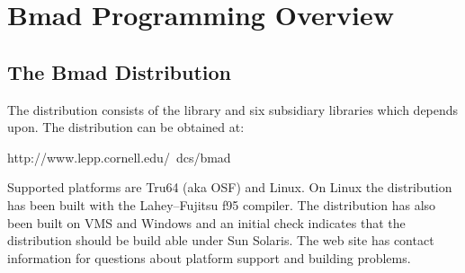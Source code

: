 \chapter{Bmad Programming Overview}
\label{c:programming}

\section {The Bmad Distribution}
\label{s:libs}

The \bmad distribution consists of the \bmad library and six subsidiary
libraries which \bmad depends upon. The \bmad distribution can be obtained at:
\begin{example}
    http://www.lepp.cornell.edu/~dcs/bmad
\end{example}
Supported platforms are Tru64 (aka OSF) and Linux. On Linux the \bmad
distribution has been built with the Lahey--Fujitsu f95 compiler. The
\bmad distribution has also been built on VMS and Windows and an
initial check indicates that the distribution should be build able
under Sun Solaris. The \bmad web site has contact information for
questions about platform support and building problems.

